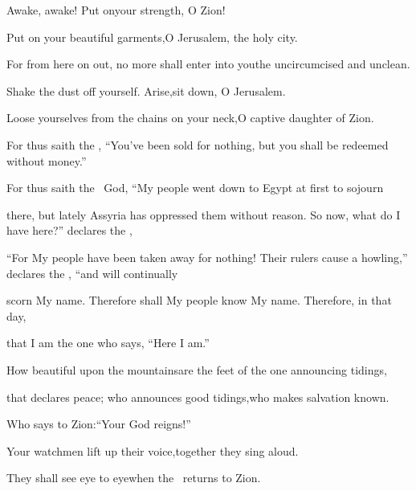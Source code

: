 
\begin{inparaenum}
  \pa{} Awake, awake!%
  Put on\pa{}your strength, O Zion!

  \pb{}Put on your beautiful garments,\pa{}O Jerusalem, the holy city.%

  \pb{}For from here on out, no more shall enter into you\pa{}the uncircumcised and unclean.%

  \pa{} Shake the dust off yourself. Arise,\pa{}sit down, O Jerusalem.%

  \pb{}Loose yourselves from the chains on your neck,\pa{}O captive daughter of Zion.\bigskip%

  \pc{} For thus saith the \lord, ``You've been sold for nothing, but you shall be redeemed without money.''%

  \pc{} For thus saith the \lord\ God, ``My people went down to Egypt at first to sojourn%

  \pc{}there, but lately Assyria has oppressed them without reason. \pa{} So now, what do I have here?'' declares the \lord,%

  \pc{}``For My people have been taken away for nothing! Their rulers cause a howling,'' declares the \lord, ``and will continually%

  \pc{}scorn My name.\pa{} Therefore shall My people know My name. Therefore, in that day,%

  \pc{} that I am the one who says, ``Here I am.''%

  \pa{} How beautiful upon the mountains\pa{}are the feet of the one announcing tidings,%

  \pb{}that declares peace; who announces good tidings,\pa{}who makes salvation known.%

  \pb{}Who says to Zion:\pa{}``Your God reigns!''%

  \pa{} Your watchmen lift up their voice,\pa{}together they sing aloud.%

  \pb{}They shall see eye to eye\pa{}when the \lord\ returns to Zion.%


\end{inparaenum}
